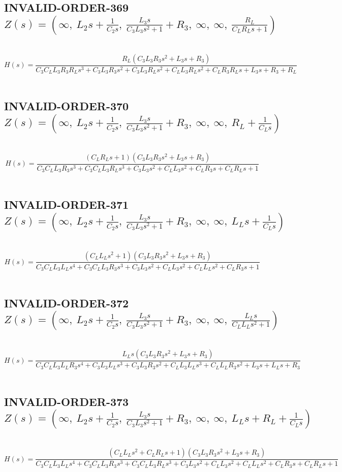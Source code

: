 \documentclass{article}
\begin{document}
\subsection{INVALID-ORDER-369 $Z(s) = \left( \infty, \  L_{2} s + \frac{1}{C_{2} s}, \  \frac{L_{3} s}{C_{3} L_{3} s^{2} + 1} + R_{3}, \  \infty, \  \infty, \  \frac{R_{L}}{C_{L} R_{L} s + 1}\right)$ } \ 
\textbf{\[H(s) = \frac{R_{L} \left(C_{3} L_{3} R_{3} s^{2} + L_{3} s + R_{3}\right)}{C_{3} C_{L} L_{3} R_{3} R_{L} s^{3} + C_{3} L_{3} R_{3} s^{2} + C_{3} L_{3} R_{L} s^{2} + C_{L} L_{3} R_{L} s^{2} + C_{L} R_{3} R_{L} s + L_{3} s + R_{3} + R_{L}}\] } \ 
\subsection{INVALID-ORDER-370 $Z(s) = \left( \infty, \  L_{2} s + \frac{1}{C_{2} s}, \  \frac{L_{3} s}{C_{3} L_{3} s^{2} + 1} + R_{3}, \  \infty, \  \infty, \  R_{L} + \frac{1}{C_{L} s}\right)$ } \ 
\textbf{\[H(s) = \frac{\left(C_{L} R_{L} s + 1\right) \left(C_{3} L_{3} R_{3} s^{2} + L_{3} s + R_{3}\right)}{C_{3} C_{L} L_{3} R_{3} s^{3} + C_{3} C_{L} L_{3} R_{L} s^{3} + C_{3} L_{3} s^{2} + C_{L} L_{3} s^{2} + C_{L} R_{3} s + C_{L} R_{L} s + 1}\] } \ 
\subsection{INVALID-ORDER-371 $Z(s) = \left( \infty, \  L_{2} s + \frac{1}{C_{2} s}, \  \frac{L_{3} s}{C_{3} L_{3} s^{2} + 1} + R_{3}, \  \infty, \  \infty, \  L_{L} s + \frac{1}{C_{L} s}\right)$ } \ 
\textbf{\[H(s) = \frac{\left(C_{L} L_{L} s^{2} + 1\right) \left(C_{3} L_{3} R_{3} s^{2} + L_{3} s + R_{3}\right)}{C_{3} C_{L} L_{3} L_{L} s^{4} + C_{3} C_{L} L_{3} R_{3} s^{3} + C_{3} L_{3} s^{2} + C_{L} L_{3} s^{2} + C_{L} L_{L} s^{2} + C_{L} R_{3} s + 1}\] } \ 
\subsection{INVALID-ORDER-372 $Z(s) = \left( \infty, \  L_{2} s + \frac{1}{C_{2} s}, \  \frac{L_{3} s}{C_{3} L_{3} s^{2} + 1} + R_{3}, \  \infty, \  \infty, \  \frac{L_{L} s}{C_{L} L_{L} s^{2} + 1}\right)$ } \ 
\textbf{\[H(s) = \frac{L_{L} s \left(C_{3} L_{3} R_{3} s^{2} + L_{3} s + R_{3}\right)}{C_{3} C_{L} L_{3} L_{L} R_{3} s^{4} + C_{3} L_{3} L_{L} s^{3} + C_{3} L_{3} R_{3} s^{2} + C_{L} L_{3} L_{L} s^{3} + C_{L} L_{L} R_{3} s^{2} + L_{3} s + L_{L} s + R_{3}}\] } \ 
\subsection{INVALID-ORDER-373 $Z(s) = \left( \infty, \  L_{2} s + \frac{1}{C_{2} s}, \  \frac{L_{3} s}{C_{3} L_{3} s^{2} + 1} + R_{3}, \  \infty, \  \infty, \  L_{L} s + R_{L} + \frac{1}{C_{L} s}\right)$ } \ 
\textbf{\[H(s) = \frac{\left(C_{L} L_{L} s^{2} + C_{L} R_{L} s + 1\right) \left(C_{3} L_{3} R_{3} s^{2} + L_{3} s + R_{3}\right)}{C_{3} C_{L} L_{3} L_{L} s^{4} + C_{3} C_{L} L_{3} R_{3} s^{3} + C_{3} C_{L} L_{3} R_{L} s^{3} + C_{3} L_{3} s^{2} + C_{L} L_{3} s^{2} + C_{L} L_{L} s^{2} + C_{L} R_{3} s + C_{L} R_{L} s + 1}\] } \ 
\end{document}
